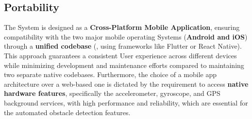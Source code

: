 \subsection{Portability}
The System is designed as a \textbf{Cross-Platform Mobile Application}, ensuring compatibility with the two major mobile operating Systems (\textbf{Android and iOS}) through a \textbf{unified codebase} (\eg, using frameworks like Flutter or React Native). This approach guarantees a consistent User experience across different devices while minimizing development and maintenance efforts compared to maintaining two separate native codebases. 
Furthermore, the choice of a mobile app architecture over a web-based one is dictated by the requirement to access \textbf{native hardware features}, specifically the accelerometer, gyroscope, and GPS background services, with high performance and reliability, which are essential for the automated obstacle detection features.
